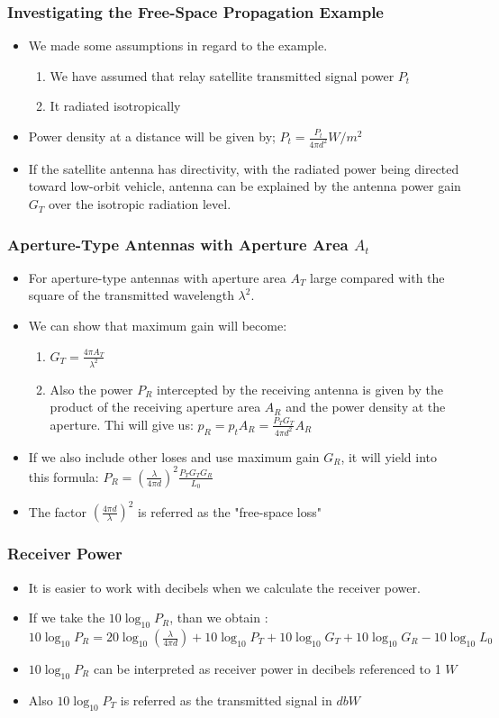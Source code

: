 \documentclass{beamer}
\begin{document}
\begin{frame}
	\frametitle{Investigating the Free-Space Propagation Example}
	\begin{itemize}
		\item We made some assumptions in regard to the example.
		\begin{enumerate}
			\item We have assumed that relay satellite transmitted signal power $P_t$
			\item It radiated isotropically
		\end{enumerate}
		\item Power density at a distance will be given by; $P_t=\frac{ P_t}{4 \pi d^2} W/m^2$
		\item If the satellite antenna has directivity, with the radiated power being directed toward low-orbit vehicle, antenna can be explained by the antenna power gain $G_T$ over the isotropic radiation level.
	\end{itemize}
\end{frame}

\begin{frame}
	\frametitle{Aperture-Type Antennas with Aperture Area $A_t$}
	\begin{itemize}
		\item For aperture-type antennas with aperture area $A_T$ large compared with the square of the transmitted wavelength $\lambda^2$.
		\item We can show that maximum gain will become:
		\begin{enumerate}
			\item $G_T= \frac{4 \pi A_T}{\lambda^2}$
			\item Also the power $P_R$ intercepted by the receiving antenna is given by the product of the receiving aperture area $A_R$ and the power density at the aperture. Thi will give us:
			$p_R= p_t A_R = \frac{P_T G_T}{4 \pi d^2} A_R$
		\end{enumerate}
		\item If we also include other loses and use maximum gain $G_R$, it will yield into this formula: $P_R=(\frac {\lambda}{4 \pi d })^2  \frac{P_T G_T G_R}{L_0} $
		\item The factor $(\frac{4 \pi d}{\lambda})^2$ is referred as the "free-space loss"
	\end{itemize}
\end{frame}

\begin{frame}
	\frametitle{Receiver Power}
	\begin{itemize}
		\item It is easier to work with decibels when we calculate the receiver power.
		\item If we take the $10 \log_ {10}  P_R$, than we obtain :
		 $10 \log_{10} P_R= 20 \log_{10} (\frac{\lambda}{4 \pi d}) +  10 \log_{10} P_T+10 \log_{10} G_T+10 \log_{10} G_R - 10 \log_{10} L_0 $
		 \item $10 \log_{10} P_R $ can be interpreted as receiver power in decibels referenced to 1 $W$
		 \item Also $10 \log_{10} P_T$  is referred as the transmitted signal in $dbW$
	\end{itemize}
\end{frame}
\end{document}
